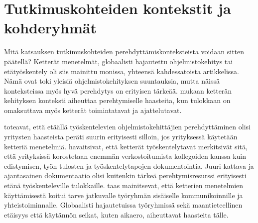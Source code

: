 \documentclass[utf8]{gradu3}
\begin{document}
\section{Tutkimuskohteiden kontekstit ja kohderyhmät}

Mitä katsauksen tutkimuskohteiden perehdyttämiskonteksteista voidaan sitten päätellä? Ketterät menetelmät, globaalisti hajautettu ohjelmistokehitys tai etätyöskentely oli siis mainittu monissa, yhteensä kahdessatoista artikkelissa. Nämä ovat toki yleisiä ohjelmistokehityksen suuntauksia, mutta näissä konteksteissa myös hyvä perehdytys on erityisen tärkeää. \textcite{gregory-ym-2020} mukaan ketterän kehityksen konteksti aiheuttaa perehtymiselle haasteita, kun tulokkaan on omaksuttava myös ketterät toimintatavat ja ajattelutavat. 

\textcite{britto-ym-2017} toteavat, että etäällä työskentelevien ohjelmistokehittäjien perehdyttäminen olisi yritysten haasteista peräti suurin erityisesti silloin, jos yrityksessä käytetään ketteriä menetelmiä. \textcite{britto-ym-2017} havaitsivat, että ketterät työskentelytavat merkitsivät sitä, että yrityksissä korostetaan enemmän verkostoitumista kollegoiden kanssa kuin edistymisen, työn tulosten ja työskentelytapojen dokumentointia. Juuri kattava ja ajantasainen dokumentaatio olisi kuitenkin tärkeä perehtymisresurssi erityisesti etänä työskenteleville tulokkaille. \textcite{moe-ym-2020} taas mainitsevat, että ketterien menetelmien käyttämisestä koitui tarve jatkuvalle työryhmän sisäiselle kommunikoinnille ja yhteistoiminnalle. Globaalisti hajautetuissa työryhmissä sekä maantieteellinen etäisyys että käytännön seikat, kuten aikaero, aiheuttavat haasteita tälle.
\end{document}
